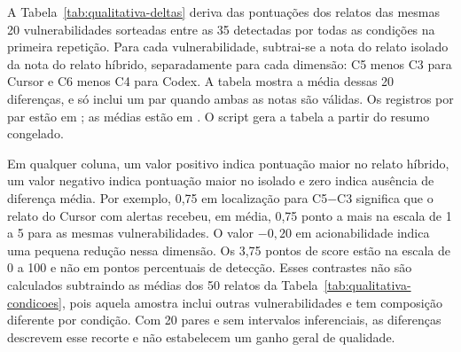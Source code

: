 \begin{table}[htb]
\ABNTEXfontereduzida
\caption{\label{tab:qualitativa-condicoes}Pontuação média dos relatos verdadeiros-positivos por condição}
\centering
\resizebox{\textwidth}{!}{}
\end{table}

A Tabela~\ref{tab:qualitativa-deltas} deriva das pontuações dos relatos das
mesmas 20 vulnerabilidades sorteadas entre as 35 detectadas por todas as
condições na primeira repetição. Para cada vulnerabilidade, subtrai-se a
nota do relato isolado da nota do relato híbrido, separadamente para cada
dimensão: C5 menos C3 para Cursor e C6 menos C4 para Codex. A tabela mostra a
média dessas 20 diferenças, e só inclui um par quando ambas as notas são
válidas. Os registros por par estão em
; as médias estão em
. O script
 gera a tabela a partir do resumo
congelado.

Em qualquer coluna, um valor positivo indica pontuação maior no relato
híbrido, um valor negativo indica pontuação maior no isolado e zero indica
ausência de diferença média. Por exemplo, 0,75 em localização para C5$-$C3
significa que o relato do Cursor com alertas recebeu, em média, 0,75 ponto
a mais na escala de 1 a 5 para as mesmas vulnerabilidades. O valor
$-0,20$ em acionabilidade indica uma pequena redução nessa dimensão. Os
3,75 pontos de score estão na escala de 0 a 100 e não em pontos percentuais
de detecção. Esses contrastes não são calculados subtraindo as médias dos
50 relatos da Tabela~\ref{tab:qualitativa-condicoes}, pois aquela amostra
inclui outras vulnerabilidades e tem composição diferente por condição.
Com 20 pares e sem intervalos inferenciais, as diferenças descrevem esse
recorte e não estabelecem um ganho geral de qualidade.

\begin{table}[htb]
\ABNTEXfontereduzida
\caption{\label{tab:qualitativa-deltas}Diferença média de pontuação no recorte comum}
\centering
\resizebox{\textwidth}{!}{}
\end{table}

